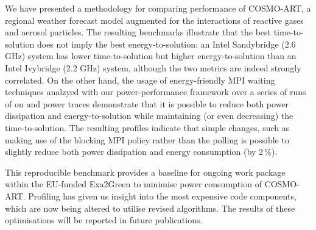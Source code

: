 We  have   presented  a  methodology  for   comparing  performance  of
COSMO-ART,  a  regional  weather  forecast  model  augmented  for  the
interactions of  reactive gases and aerosol  particles.  The resulting
benchmarks illustrate  that the  best time-to-solution does  not imply
the best energy-to-solution: an Intel Sandybridge (2.6 GHz) system has
lower  time-to-solution but  higher energy-to-solution  than  an Intel
Ivybridge  (2.2  GHz) system,  although  the  two  metrics are  indeed
strongly correlated.  On the other hand, the  usage of energy-friendly
MPI waiting  techniques analzyed with  our power-performance framework
over  a  series  of runs  of  \cosmoart  on  \tinto and  power  traces
demonstrate that it  is possible to reduce both  power dissipation and
energy-to-solution   while  maintaining   (or  even   decreasing)  the
time-to-solution. The resulting profiles indicate that simple changes,
such as making use of the  blocking MPI policy rather than the polling
is  possible to  slightly  reduce both  power  dissipation and  energy
consumption (by 2\,\%).

This  reproducible  benchmark provides  a  baseline  for ongoing  work
package within  the EU-funded Exa2Green to  minimise power consumption
of COSMO-ART. Profiling  has given us insight into  the most expensive
code  components,  which are  now  being  altered  to utilise  revised
algorithms.  The  results of these  optimisations will be  reported in
future publications.

